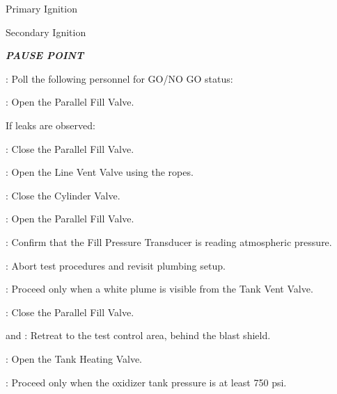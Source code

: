 \begin{checklist}
\begin{checklist}
        \item Primary Ignition
        \item Secondary Ignition
    \end{checklist}
    \item \textbf{\textit{PAUSE POINT}}
    \item \ops{}: Poll the following personnel for GO/NO GO status:
    \begin{checklist}
        \item \peri{}
        \item \perii{}
        \item \periii{}
        \item \heat
        \item \daq{}
        \item \primary{}
        \item \secondary
    \end{checklist}
    \item \primary{}: Open the Parallel Fill Valve.
    \begin{checklist}[label=$\bullet$]
        \item If leaks are observed:
        \begin{checklist}
            \item \primary{}: Close the Parallel Fill Valve.
            \item \primary{}: Open the Line Vent Valve using the ropes.
            \item \primary{}: Close the Cylinder Valve.
            \item \primary{}: Open the Parallel Fill Valve.
            \item \daq{}: Confirm that the Fill Pressure Transducer is reading atmospheric pressure.
            \item \ops{}: Abort test procedures and revisit plumbing setup.
        \end{checklist}
    \end{checklist}
    \item \secondary{}: Proceed only when a white plume is visible from the Tank Vent Valve.
    \item \primary{}: Close the Parallel Fill Valve.
    \item \primary{} and \secondary: Retreat to the test control area, behind the blast shield.
    \item \heat: Open the Tank Heating Valve.
    \item \daq{}: Proceed only when the oxidizer tank pressure is at least 750 psi.

\end{checklist}
